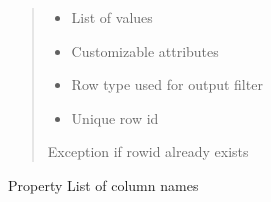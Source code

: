 \documentclass[letterpaper,10pt,english]{sphinxmanual}
\begin{document}
\begin{savenotes}
\begin{fulllineitems}
\begin{savenotes}
\begin{fulllineitems}
\begin{quote}
\begin{description}
\begin{itemize}
\item {} 
\sphinxAtStartPar
{} \textendash{} List of values

\item {} 
\sphinxAtStartPar
{} \textendash{} Customizable attributes

\item {} 
\sphinxAtStartPar
{} \textendash{} Row type used for output filter

\item {} 
\sphinxAtStartPar
{} \textendash{} Unique row id

\end{itemize}

\sphinxAtStartPar
{} \textendash{} Exception if row\sphinxhyphen{}id already exists

\end{description}\end{quote}

\end{fulllineitems}\end{savenotes}


\begin{savenotes}\begin{fulllineitems}
\label{\detokenize{eezz:eezz.table.TTable.column_names}}
\pysigstartsignatures
{}
\pysigstopsignatures
\sphinxAtStartPar
Property \sphinxhyphen{} List of column names

\end{fulllineitems}\end{savenotes}



\end{fulllineitems}
\end{savenotes}
\end{document}
